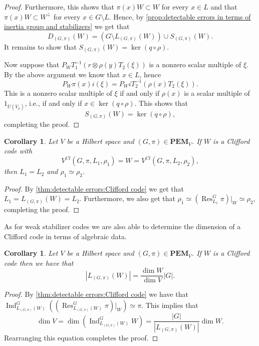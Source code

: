 \documentclass[11pt, oneside, reqno]{amsart}
\newcommand{\PEM}{\mathbf{PEM}}
\newcommand{\Res}{\operatorname{Res}}
\newcommand{\Ind}{\operatorname{Ind}}
\theoremstyle{definition}
\theoremstyle{plain}
\newtheorem{corollary}[definition]{Corollary}
\theoremstyle{remark}
\begin{document}
\begin{proof}
    Furthermore, this shows that $\pi(x)W \subset W$ for every $x \in L$ and that $\pi(x)W \subset W^\perp$ for every $x \in G \setminus L$. Hence, by \cref{prop:detectable errors in terms of inertia group and stabilizers} we get that
    \begin{equation*}
        D_{(G,\pi)}(W) = (G \setminus L_{(G,\pi)}(W)) \cup S_{(G,\pi)}(W).
    \end{equation*}
    It remains to show that $S_{(G,\pi)}(W) = \ker(q \circ \rho)$.

    Now suppose that $P_W T_1^{-1} (r \otimes \rho(y)T_2(\xi))$ is a nonzero scalar multiple of $\xi$. By the above argument we know that $x \in L$, hence
    \begin{equation*}
        P_W\pi(x) i(\xi)
        = P_W i T_2^{-1}(\rho(x)T_2(\xi)).
    \end{equation*}
    This is a nonzero scalar multiple of $\xi$ if and only if $\rho(x)$ is a scalar multiple of $1_{U(V_\rho)}$, i.e., if and only if $x \in \ker(q \circ \rho)$. This shows that
    \begin{equation*}
        S_{(G,\pi)}(W) = \ker(q \circ \rho),
    \end{equation*}
    completing the proof.
\end{proof}

\begin{corollary}\label{cor:Clifford codes has unique inertia group}
    Let $V$ be a Hilbert space and $(G,\pi) \in \PEM_V$. If $W$ is a Clifford code with
    \begin{equation*}
        V^{Cl}(G,\pi,L_1,\rho_1) = W = V^{Cl}(G,\pi,L_2,\rho_2),
    \end{equation*}
    then $L_1 = L_2$ and $\rho_1 \simeq \rho_2$.
\end{corollary}
\begin{proof}
    By \cref{thm:detectable errors:Clifford code} we get that $L_1 = L_{(G,\pi)}(W) = L_2$. Furthermore, we also get that $\rho_1 \simeq (\Res^G_{L_1}\pi)|_W \simeq \rho_2$, completing the proof.
\end{proof}

As for weak stabilizer codes we are also able to determine the dimension of a Clifford code in terms of algebraic data.

\begin{corollary}\label{cor:order of inertia group for Clifford codes}
    Let $V$ be a Hilbert space and $(G,\pi) \in \PEM_V$. If $W$ is a Clifford code then we have that
    \begin{equation*}
        |L_{(G,\pi)}(W)| = \frac{\dim W}{\dim V} |G|.
    \end{equation*}
\end{corollary}
\begin{proof}
    By \cref{thm:detectable errors:Clifford code} we have that $\Ind^G_{L_{(G,\pi)}(W)}((\Res^G_{L_{(G,\pi)}(W)}\pi)|_W) \simeq \pi$. This implies that
    \begin{equation*}
        \dim V 
        = \dim(\Ind^G_{L_{(G,\pi)}(W)} W) 
        = \frac{|G|}{|L_{(G,\pi)}(W)|} \dim W.
    \end{equation*}
    Rearranging this equation completes the proof.
\end{proof}
\end{document}
